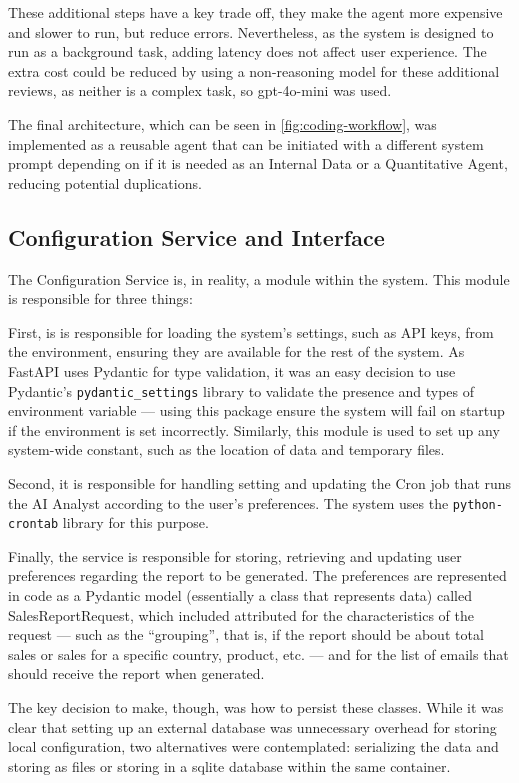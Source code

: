 \documentclass[a4paper]{report}
\begin{document}
These additional steps have a key trade off, they make the agent more expensive and slower to run, but reduce errors. Nevertheless, as the system is designed to run as a background task, adding latency does not affect user experience. The extra cost could be reduced by using a non-reasoning model for these additional reviews, as neither is a complex task, so gpt-4o-mini was used.

The final architecture, which can be seen in \autoref{fig:coding-workflow}, was implemented as a reusable agent that can be initiated with a different system prompt depending on if it is needed as an Internal Data or a Quantitative Agent, reducing potential duplications.

\subsection{Configuration Service and Interface}

The Configuration Service is, in reality, a module within the system. This module is responsible for three things:

First, is is responsible for loading the system's settings, such as API keys, from the environment, ensuring they are available for the rest of the system. As FastAPI uses Pydantic for type validation, it was an easy decision to use Pydantic's \texttt{pydantic\_settings} library to validate the presence and types of environment variable --- using this package ensure the system will fail on startup if the environment is set incorrectly. Similarly, this module is used to set up any system-wide constant, such as the location of data and temporary files.

Second, it is responsible for handling setting and updating the Cron job that runs the AI Analyst according to the user's preferences. The system uses the \texttt{python-crontab} library for this purpose.

Finally, the service is responsible for storing, retrieving and updating user preferences regarding the report to be generated. The preferences are represented in code as a Pydantic model (essentially a class that represents data) called SalesReportRequest, which included attributed for the characteristics of the request --- such as the ``grouping'', that is, if the report should be about total sales or sales for a specific country, product, etc. --- and for the list of emails that should receive the report when generated.

The key decision to make, though, was how to persist these classes. While it was clear that setting up an external database was unnecessary overhead for storing local configuration, two alternatives were contemplated: serializing the data and storing as files or storing in a sqlite database within the same container.
\end{document}
